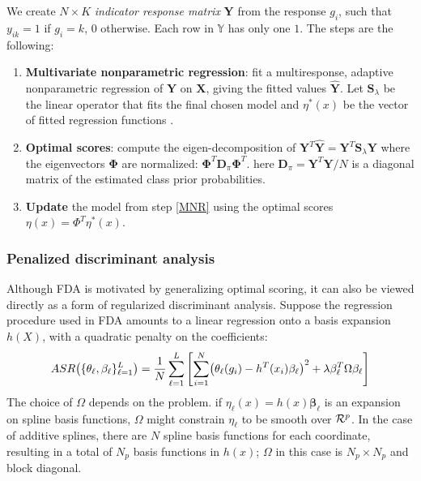 \documentclass[12pt, letterpaper]{article}
\theoremstyle{definition}
\newcommand{\be}{\mathbf{\beta}}
\DeclarePairedDelimiter\autobracket{(}{)}
\newcommand{\br}[1]{\autobracket*{#1}}
\begin{document}
We create $N \times K$ \textit{indicator response matrix} \textbf{Y} from the response $g_i$, such that $y_{ik} = 1$ if $g_i =k$, $0$ otherwise. Each row in $\mathbb{Y}$ has only one $1$.
The steps are the following:
\begin{enumerate}
\item \textbf{Multivariate nonparametric regression}: fit a multiresponse, adaptive nonparametric regression of $\mathbf{Y}$ on $\mathbf{X}$, giving the fitted values $\mathbf{\hat{Y}}$. Let $\mathbf{S}_\lambda$ be the linear operator that fits the final chosen model and $\eta^*(x)$ be the vector of fitted regression functions \label{MNR}.
\item \textbf{Optimal scores}: compute the eigen-decomposition of $\mathbf{Y}^T\mathbf{\hat{Y}}=\mathbf{Y}^T\mathbf{S}_\lambda \mathbf{Y}$ where the eigenvectors $\mathbf{\Phi}$ are normalized: $\mathbf{\Phi}^T\mathbf{D}_\pi\mathbf{\Phi}^T$. here $\mathbf{D}_\pi = \mathbf{Y}^T\mathbf{Y}/N$ is a diagonal matrix of the estimated class prior probabilities.
\item \textbf{Update} the model from step \autoref{MNR} using the optimal scores $\eta(x) = \Phi^T\eta^*(x)$.
\end{enumerate}  
\subsubsection{Penalized discriminant analysis}
Although FDA is motivated by generalizing optimal scoring, it can also be viewed directly as a form of regularized discriminant analysis. Suppose the regression procedure used in FDA amounts to a linear regression onto a basis expansion $h(X)$, with a quadratic penalty on the coefficients:
\begin{equation}
ASR\br{\{ \theta_\ell, \be_\ell\}_{\ell=1}^L} = \frac{1}{N}\sum_{\ell=1}^L\left[\sum_{i=1}^N \br{\theta_\ell(g_i) - h^T(x_i)\be_\ell}^2 + \lambda \be_\ell^T\Omega \be_\ell\right]
\end{equation}
The choice of $\Omega$ depends on the problem. if $\eta_\ell(x) = h(x)\be_\ell$ is an expansion on spline basis functions, $\Omega$ might constrain $\eta_\ell$ to be smooth over $\CMcal{R}^p$. In the case of additive splines, there are $N$ spline basis functions for each coordinate, resulting in a total of $N_p$ basis functions in $h(x)$; $\Omega$ in this case is $N_p \times N_p$ and block diagonal.
\end{document}
